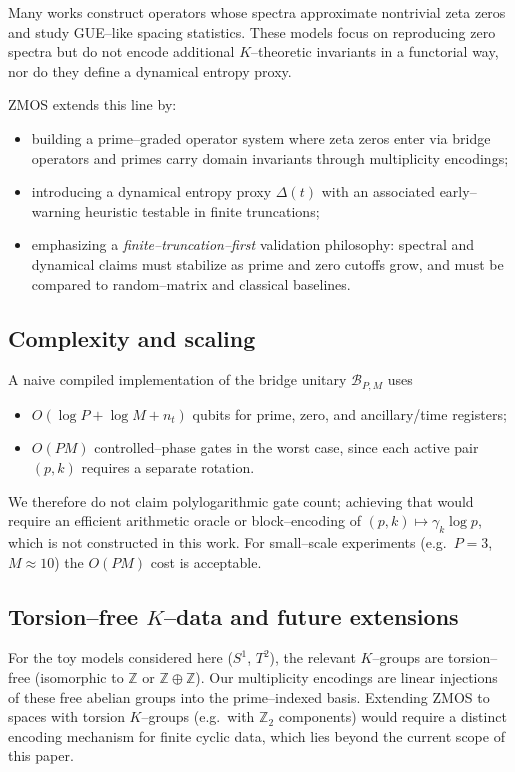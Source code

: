 \documentclass[11pt]{article}
\begin{document}
Many works construct operators whose spectra approximate nontrivial zeta zeros and study GUE--like spacing statistics.
These models focus on reproducing zero spectra but do not encode additional $K$--theoretic invariants in a functorial way, nor do they define a dynamical entropy proxy.

ZMOS extends this line by:
\begin{itemize}
  \item building a prime--graded operator system where zeta zeros enter via bridge operators and primes carry domain invariants through multiplicity encodings;
  \item introducing a dynamical entropy proxy $\Delta(t)$ with an associated early--warning heuristic testable in finite truncations;
  \item emphasizing a \emph{finite--truncation--first} validation philosophy: spectral and dynamical claims must stabilize as prime and zero cutoffs grow, and must be compared to random--matrix and classical baselines.
\end{itemize}

\subsection{Complexity and scaling}

A naive compiled implementation of the bridge unitary $\mathcal{B}_{P,M}$ uses
\begin{itemize}
  \item $O(\log P + \log M + n_t)$ qubits for prime, zero, and ancillary/time registers;
  \item $O(PM)$ controlled--phase gates in the worst case, since each active pair $(p,k)$ requires a separate rotation.
\end{itemize}
We therefore do not claim polylogarithmic gate count; achieving that would require an efficient arithmetic oracle or block--encoding of $(p,k)\mapsto \gamma_k \log p$, which is not constructed in this work.
For small--scale experiments (e.g.\ $P = 3$, $M \approx 10$) the $O(PM)$ cost is acceptable.

\subsection{Torsion--free $K$--data and future extensions}

For the toy models considered here ($S^1$, $T^2$), the relevant $K$--groups are torsion--free (isomorphic to $\mathbb{Z}$ or $\mathbb{Z}\oplus\mathbb{Z}$).
Our multiplicity encodings are linear injections of these free abelian groups into the prime--indexed basis.
Extending ZMOS to spaces with torsion $K$--groups (e.g.\ with $\mathbb{Z}_2$ components) would require a distinct encoding mechanism for finite cyclic data, which lies beyond the current scope of this paper.
\end{document}
